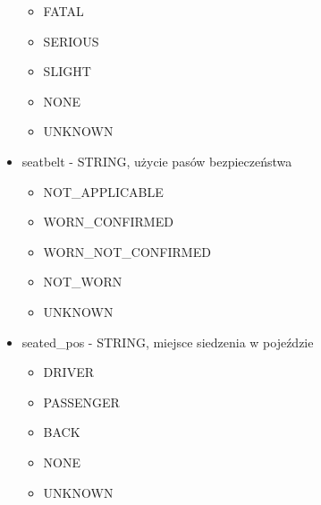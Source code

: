 \begin{itemize}
  \begin{itemize}
  \itemsep1pt\parskip0pt
  \item
    FATAL\\
  \item
    SERIOUS\\
  \item
    SLIGHT\\
  \item
    NONE\\
  \item
    UNKNOWN\\
  \end{itemize}
\item
  seatbelt - STRING, użycie pasów bezpieczeństwa

  \begin{itemize}
  \itemsep1pt\parskip0pt
  \item
    NOT\_APPLICABLE\\
  \item
    WORN\_CONFIRMED\\
  \item
    WORN\_NOT\_CONFIRMED\\
  \item
    NOT\_WORN\\
  \item
    UNKNOWN\\
  \end{itemize}
\item
  seated\_pos - STRING, miejsce siedzenia w pojeździe

  \begin{itemize}
  \itemsep1pt\parskip0pt
  \item
    DRIVER\\
  \item
    PASSENGER\\
  \item
    BACK\\
  \item
    NONE\\
  \item
    UNKNOWN
  \end{itemize}
\end{itemize}
